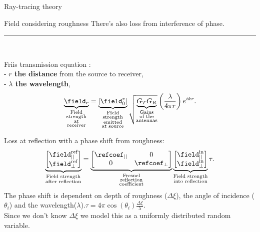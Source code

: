 \documentclass[8pt]{beamer}
\begin{document}
\begin{frame}{Ray-tracing theory}
\begin{block}{Field considering roughness}
There's also loss from interference of phase.
\\
\noindent\rule{\linewidth}{0.4pt}%
\\
\begin{minipage}{\twocols}
\vspace{-1cm} Friis transmission equation \footnotemark[1]: \\
- \textbf{$r$ the distance} from the source to receiver, 
\\-  \textbf{$\lambda$ the wavelength},
\begin{equation*}
\underbrace{\field_r}_{\substack{\text{Field} \\ \text{strength} \\ \text{at} \\ \text{receiver}}}=\underbrace{|\field_0^*|}_{\substack{\text{Field} \\ \text{strength} \\ \text{emitted} \\ \text{at source}}}\sqrt{\underbrace{G_TG_R}_{\substack{\text{Gains} \\\text{of the} \\  \text{antennas}}}} \left(\frac{\lambda}{4 \pi r} \right)e^{ikr}.
\end{equation*}
\end{minipage}%
\begin{minipage}{\sepwid}
\mbox{}
\end{minipage}
\begin{minipage}{\twocols}
Loss at reflection with a phase shift from roughness:
\begin{equation*}
\underbrace{\begin{bmatrix}
\field^{\text{ref}}_{||} \\ \field^{\text{ref}}_{\perp}
\end{bmatrix}}_{\substack{\text{Field strength} \\ \text{after reflection}}}=\underbrace{
\begin{bmatrix} \refcoef_{||} & 0 \\ 0 & \refcoef_{\perp}  \end{bmatrix}}_{\substack{\text{Fresnel} \\ \text{reflection} \\ \text{coefficient}}}\underbrace{\begin{bmatrix} \field^{\text{in}}_{||} \\ \field^{\text{in}}_{\perp}
\end{bmatrix}}_{\substack{\text{Field strength} \\ \text{into reflection}}}\tau.
\end{equation*}
The phase shift is dependent on depth of roughness ($\Delta \xi$), the angle of incidence ($\theta_i$) and the wavelength($\lambda$).$\tau=4 \pi \cos(\theta_i)\frac{\Delta \xi}{\lambda}$. 
\\ Since we don't know $\Delta \xi$ we model this as a uniformly distributed random variable.
\end{minipage}%
\end{block}
\end{frame}
\end{document}
